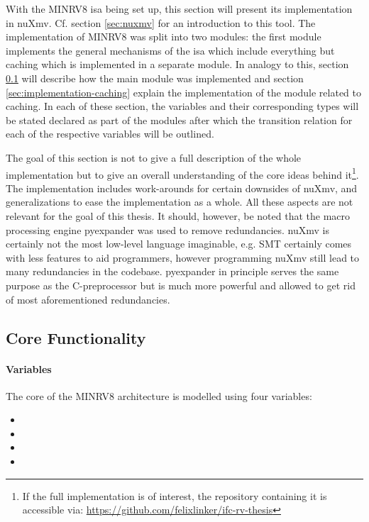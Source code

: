 With the MINRV8 \gls{isa} being set up, this section will present its implementation in nuXmv.
Cf. section \ref{sec:nuxmv} for an introduction to this tool.
The implementation of MINRV8 was split into two modules:
the first module implements the general mechanisms of the \gls{isa} which include everything but caching which is implemented in a separate module.
In analogy to this, section \ref{sec:implementation-core} will describe how the main module was implemented and section \ref{sec:implementation-caching} explain the implementation of the module related to caching.
In each of these section, the variables and their corresponding types will be stated declared as part of the modules after which the transition relation for each of the respective variables will be outlined.

The goal of this section is not to give a full description of the whole implementation but to give an overall understanding of the core ideas behind it\footnote{%
    If the full implementation is of interest, the repository containing it is accessible via: \url{https://github.com/felixlinker/ifc-rv-thesis}
}.
The implementation includes work-arounds for certain downsides of nuXmv, and generalizations to ease the implementation as a whole.
All these aspects are not relevant for the goal of this thesis.
It should, however, be noted that the macro processing engine pyexpander \cite{pyexpander} was used to remove redundancies.
nuXmv is certainly not the most low-level language imaginable, e.g. SMT certainly comes with less features to aid programmers, however programming nuXmv still lead to many redundancies in the codebase.
pyexpander in principle serves the same purpose as the C-preprocessor but is much more powerful and allowed to get rid of most aforementioned redundancies.

\subsection{Core Functionality}
\label{sec:implementation-core}

\paragraph{Variables}
The core of the MINRV8 architecture is modelled using four variables:
\begin{itemize}
    \item {}
    \item {}
    \item {}
    \item {}
\end{itemize}

